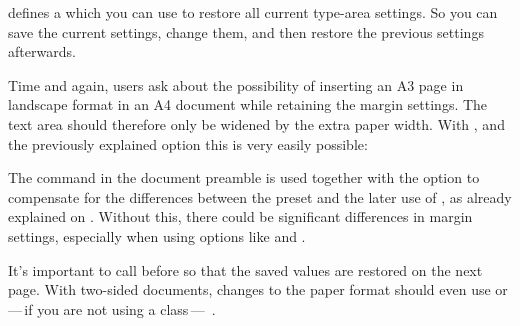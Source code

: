 \begin{Declaration}
\end{Declaration}
 defines a  which you can use to
restore all current type-area settings. So you can save the current settings,
change them, and then restore the previous settings afterwards.

\begin{Example}
  Time and again, users ask about the possibility of inserting an A3 page in
  landscape format in an A4 document while retaining the margin settings. The
  text area should therefore only be widened by the extra paper width. With
  ,  and the previously
  explained option  this is very
  easily possible:

  The  command in the
  document preamble is used together with the
  option to compensate for the differences between the
   preset and the later use of
  , as already explained on
  . Without this, there could
  be significant differences in margin settings, especially when using options
  like  and
  .

  It's important to call 
  before  so that the saved values are restored on
  the next page. With two-sided documents, changes to the paper format should
  even use
  or\,---\,if you are not using a \KOMAScript{}
  class\,---\,%
  .%
\end{Example}

